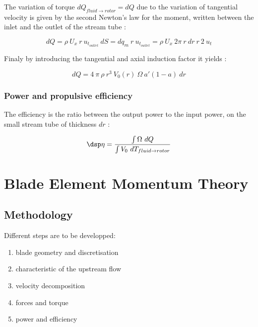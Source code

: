 The variation of torque $dQ_{fluid\to rotor}=dQ$ due to the variation of tangential velocity is given by the second
Newton's law for the moment, written between the inlet and the outlet of the stream tube :

$$
dQ = \rho~U_x~r~u_{t_{outlet}}~dS= dq_m~r~u_{t_{outlet}} =  \rho~U_x~2\pi~r~dr~r~2~u_t
$$

Finaly by introducing the tangential and axial induction factor it yields :

\begin{equation}
dQ = 4~\pi~\rho~r^3~V_0(r)~\Omega~a'(1-a)~dr
\label{eq:def_dM}
\end{equation}



\subsubsection{\sc Power and propulsive efficiency}


The efficiency is the ratio between the output power to the input power, on the small stream tube of thickness $dr$ :

$$ \dsp
\eta =  \frac{\int \Omega~dQ}{\int V_0~dT_{fluid\to rotor}}  
$$
 


\section{Blade Element Momentum Theory}

\subsection{Methodology}

Different steps are to be developped:

\begin{enumerate}
\item blade geometry and discretisation
\item characteristic of the upstream flow
\item velocity decomposition
\item forces and torque
\item power and efficiency
\end{enumerate}

